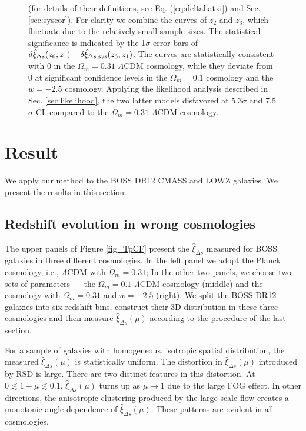 \documentclass[iop]{emulateapj}
\begin{document}
\begin{figure}
{   (for details of their definitions, see Eq. (\ref{eq:deltahatxi}) and Sec. \ref{sec:syscor}).
   For clarity we combine the curves of $z_2$ and $z_3$, which fluctuate
   due to the relatively small sample sizes.
   The statistical significance is indicated by the 1$\sigma$ error bars of $\delta\hat \xi_{\Delta s}(z_6,z_1)-\delta\hat \xi_{\Delta s,\rm sys}(z_6,z_1)$.
   The curves are statistically consistent with 0 in the $\Omega_m=0.31$ $\Lambda$CDM cosmology,
    while they deviate from 0 at significant confidence levels in the $\Omega_m=0.1$ cosmology and the $w=-2.5$ cosmology.
   Applying the likelihood analysis described in Sec. \ref{sec:likelihood},
    the two latter models disfavored at 5.3$\sigma$ and 7.5$\sigma$ CL compared to the $\Omega_m=0.31$ $\Lambda$CDM cosmology.
   }
\end{figure}

\section{Result}

We apply our method to the BOSS DR12 CMASS and LOWZ galaxies.
We present the results in this section.

\subsection{Redshift evolution in wrong cosmologies}\label{sec:redevolvxi}




The upper panels of Figure \ref{fig_TpCF} present the $\hat \xi_{\Delta s}$ measured for BOSS galaxies in three different cosmologies.
In the left panel we adopt the Planck cosmology, i.e., $\Lambda$CDM with $\Omega_m=0.31$;
In the other two panels, we choose two sets of parameters ---
the $\Omega_m=0.1$ $\Lambda$CDM cosmology (middle) and the cosmology with $\Omega_m=0.31$ and $w=-2.5$ (right).
We split the BOSS DR12 galaxies into six redshift bins,
construct their 3D distribution in these three cosmologies
and then measure $\hat \xi_{\Delta s}(\mu)$ according to the procedure of the last section.

For a sample of galaxies with homogeneous, isotropic spatial distribution, 
the measured $\hat \xi_{\Delta s}(\mu)$ is statistically uniform.
The distortion in $\hat \xi_{\Delta s}(\mu)$ introduced by RSD is large.
There are two distinct features in this distortion.
At $0\lesssim 1-\mu \lesssim 0.1$, $\hat \xi_{\Delta s}(\mu)$ turns up as $\mu\rightarrow1$
due to the large FOG effect.
In other directions, the anisotropic clustering produced by the large scale flow creates a monotonic angle dependence of $\hat\xi_{\Delta s}(\mu)$. %
These patterns are evident in all cosmologies.
\end{document}
